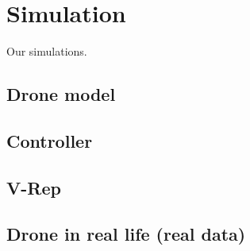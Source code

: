 \chapter{Simulation}\label{ch:simulation}
Our simulations.

\section{Drone model}

\section{Controller}

\section{V-Rep}

\section{Drone in real life (real data)}